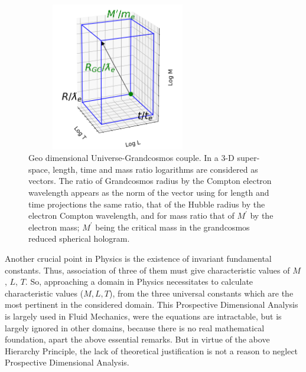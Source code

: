 \documentclass[twoside,draft]{article}
\begin{document}
\begin{sloppypar}
{\begin{figure}[h]
\centering
\includegraphics[width=8cm,height=6.5cm]{./figures/triaxis.png}
\caption{Geo dimensional Universe-Grandcosmos couple. In a 3-D super-space, length, time and mass ratio logarithms are considered as vectors. The ratio of Grandcosmos radius by the Compton electron wavelength appears as the norm of the vector using for length and time projections the same ratio, that of the Hubble radius by the electron Compton wavelength, and for mass ratio that of $M^{\prime}$ by the electron mass; $M^{\prime}$ being the critical mass in the grandcosmos reduced spherical hologram. }
\end{figure}

Another crucial point in Physics is the existence of invariant fundamental constants. Thus,
association of three of them must give characteristic values of $M$, $L$, $T$. So, approaching a domain in
Physics necessitates to calculate characteristic values ($M, L, T$), from the three universal constants
which are the most pertinent in the considered domain. This Prospective Dimensional Analysis is
largely used in Fluid Mechanics, were the equations are intractable, but is largely ignored in other
domains, because there is no real mathematical foundation, apart the above essential remarks. But
in virtue of the above Hierarchy Principle, the lack of theoretical justification is not a reason to
neglect Prospective Dimensional Analysis.

}
\end{sloppypar}
\end{document}
